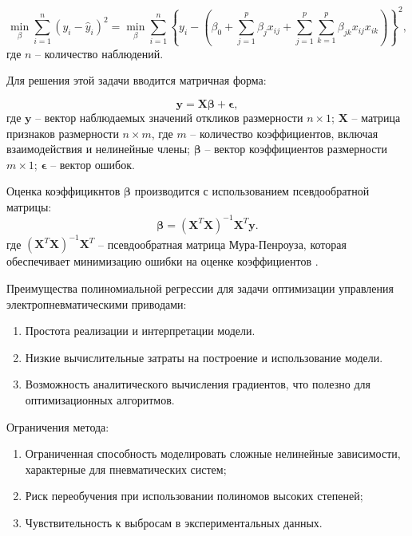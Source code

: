 \begin{equation}
	\min_{\beta} \sum_{i=1}^{n} (y_i - \hat{y}_i)^2 =
	\min_{\beta} \sum_{i=1}^{n} \left\{
	y_i - \left(\beta_0 + \sum_{j=1}^{p} \beta_j x_{ij}
	+ \sum_{j=1}^{p} \sum_{k=1}^{p} \beta_{jk} x_{ij} x_{ik}
	\right)
	\right\}^2,
\end{equation}
где $n$ -- количество наблюдений.

Для решения этой задачи вводится матричная форма:

\begin{equation}
	\mathbf{y} = \mathbf{X} \boldsymbol{\beta} + \boldsymbol{\epsilon},
\end{equation}
где $\mathbf{y}$ -- вектор наблюдаемых значений откликов размерности $n \times 1$;
$\mathbf{X}$ -- матрица признаков размерности $n \times m$, где $m$ -- количество коэффициентов,
включая взаимодействия и нелинейные члены;
$\boldsymbol{\beta}$ -- вектор коэффициентов размерности $m \times 1$;
$\boldsymbol{\epsilon}$ -- вектор ошибок.

Оценка коэффицикнтов $\boldsymbol{\beta}$ производится с использованием псевдообратной матрицы:
\begin{equation}
	\boldsymbol{\beta} = (\mathbf{X}^T \mathbf{X})^{-1} \mathbf{X}^T \mathbf{y}.
\end{equation}
где $(\mathbf{X}^T \mathbf{X})^{-1} \mathbf{X}^T$ -- псевдообратная матрица Мура-Пенроуза,
которая обеспечивает минимизацию ошибки на оценке коэффициентов \cite{meyer2009matrix}.

Преимущества полиномиальной регрессии для задачи оптимизации управления электропневматическими приводами:
\begin{enumerate}
	\item Простота реализации и интерпретации модели.
	\item Низкие вычислительные затраты на построение и использование модели.
	\item Возможность аналитического вычисления градиентов, что полезно для оптимизационных алгоритмов.
\end{enumerate}

Ограничения метода:
\begin{enumerate}
	\item Ограниченная способность моделировать сложные нелинейные зависимости, характерные для пневматических систем;
	\item Риск переобучения при использовании полиномов высоких степеней;
	\item Чувствительность к выбросам в экспериментальных данных.
\end{enumerate}

